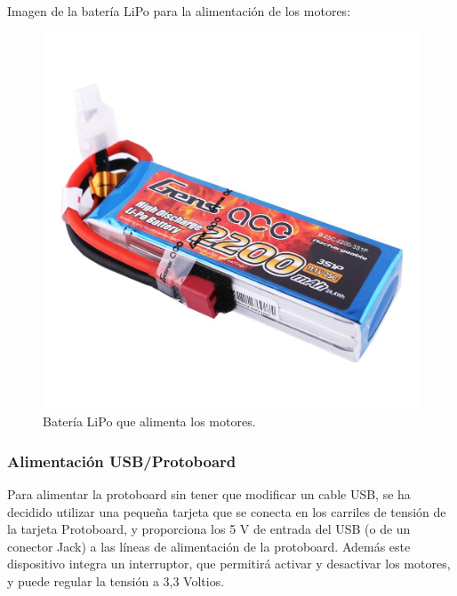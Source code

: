 Imagen de la batería LiPo para la alimentación de los motores:

\begin{figure}[H]
  \begin{center}
    \includegraphics[scale=0.2]{imagenes/robot/bateria.jpg}
  \end{center}
  \caption{Batería LiPo que alimenta los motores.}
  \label{figura:rpi-modulo-bateria}
\end{figure}


\subsubsection{ Alimentación USB/Protoboard }

Para alimentar la protoboard sin tener que modificar un cable USB, se ha decidido utilizar una pequeña tarjeta que se conecta en los carriles de tensión de la tarjeta Protoboard, y
proporciona los 5 V de entrada del USB (o de un conector Jack) a las líneas de alimentación de la protoboard. Además este dispositivo integra un interruptor, que permitirá activar y
desactivar los motores, y puede regular la tensión a 3,3 Voltios.\\

